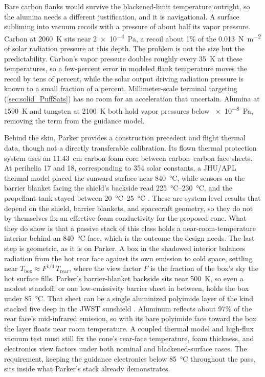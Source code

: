 \documentclass{article}
\begin{document}
Bare carbon flanks would survive the blackened-limit temperature outright, so the alumina needs a different justification, and it is navigational. A surface subliming into vacuum recoils with a pressure of about half its vapor pressure. Carbon at \SI{2060}{\kelvin} sits near \SI{2e-4}{\pascal}, a recoil about 1\% of the \SI{0.013}{\newton\per\square\meter} of solar radiation pressure at this depth. The problem is not the size but the predictability. Carbon's vapor pressure doubles roughly every \SI{35}{\kelvin} at these temperatures, so a few-percent error in modeled flank temperature moves the recoil by tens of percent, while the solar output driving radiation pressure is known to a small fraction of a percent. Millimeter-scale terminal targeting (\autoref{sec:solid_PuffSats}) has no room for an acceleration that uncertain. Alumina at \SI{1590}{\kelvin} and tungsten at \SI{2100}{\kelvin} both hold vapor pressures below \SI{e-8}{\pascal}, removing the term from the guidance model.

Behind the skin, Parker provides a construction precedent and flight thermal data, though not a directly transferable calibration. Its flown thermal protection system uses an \SI{11.43}{\centi\meter} carbon-foam core between carbon--carbon face sheets. At perihelia 17 and 18, corresponding to 354 solar constants, a JHU/APL thermal model placed the sunward surface near \SI{840}{\celsius}, while sensors on the barrier blanket facing the shield's backside read \SIrange{225}{230}{\celsius}, and the propellant tank stayed between \SIrange[range-phrase={ and }]{20}{25}{\celsius} \cite{ercol2024_parker_thermal}. These are system-level results that depend on the shield, barrier blankets, and spacecraft geometry, so they do not by themselves fix an effective foam conductivity for the proposed cone. What they do show is that a passive stack of this class holds a near-room-temperature interior behind an \SI{840}{\celsius} face, which is the outcome the design needs. The last step is geometric, as it is on Parker. A box in the shadowed interior balances radiation from the hot rear face against its own emission to cold space, settling near $T_{\mathrm{box}} \approx F^{1/4}\, T_{\mathrm{rear}}$, where the view factor $F$ is the fraction of the box's sky the hot surface fills. Parker's barrier-blanket backside sits near \SI{500}{\kelvin}, so even a modest standoff, or one low-emissivity barrier sheet in between, holds the box under \SI{85}{\celsius}. That sheet can be a single aluminized polyimide layer of the kind stacked five deep in the JWST sunshield \cite{jwst_sunshield}. Aluminum reflects about 97\% of the rear face's mid-infrared emission, so with its bare polyimide face toward the box the layer floats near room temperature. A coupled thermal model and high-flux vacuum test must still fix the cone's rear-face temperature, foam thickness, and electronics view factors under both nominal and blackened-surface cases. The requirement, keeping the guidance electronics below \SI{85}{\celsius} throughout the pass, sits inside what Parker's stack already demonstrates.
\end{document}
